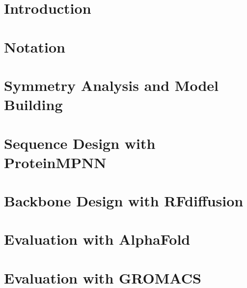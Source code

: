 \documentclass[12pt]{article}
\theoremstyle{definition}
\begin{document}
\tableofcontents
\clearpage

\section{Introduction}\label{ch:introduction}


\section{Notation}\label{ch:notation}


\section{Symmetry Analysis and Model Building}\label{ch:symmetry}


\section{Sequence Design with ProteinMPNN}\label{ch:pmpnn}


\section{Backbone Design with RFdiffusion}\label{ch:rfdiffusion}


\section{Evaluation with AlphaFold}\label{ch:alphafold}


\section{Evaluation with GROMACS}\label{ch:gromacs}


\clearpage
\printbibliography
\end{document}
